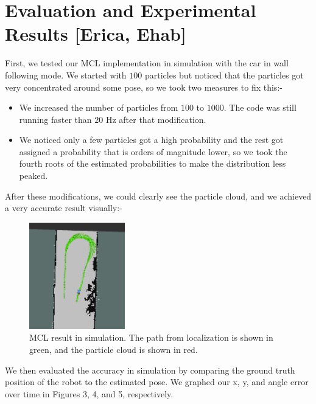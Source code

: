 \documentclass[11pt,twocolumn]{article}
\begin{document}
\section{Evaluation and Experimental Results [Erica, Ehab]}

First, we tested our MCL implementation in simulation with the car in wall following mode. We started with $100$ particles but noticed that the particles got very concentrated around some pose, so we took two measures to fix this:-

\begin{itemize}
    \item We increased the number of particles from $100$ to $1000$. The code was still running faster than $20$ Hz after that modification.
    \item We noticed only a few particles got a high probability and the rest got assigned a probability that is orders of magnitude lower, so we took the fourth roots of the estimated probabilities to make the distribution less peaked.
\end{itemize}

After these modifications, we could clearly see the particle cloud, and we achieved a very accurate result visually:-

\begin{figure}[H]
    \centering
    \includegraphics{RSS_localization.png}
    \caption{MCL result in simulation. The path from localization is shown in green, and the particle cloud is shown in red.}
    \label{fig:enter-label}
\end{figure}

We then evaluated the accuracy in simulation by comparing the ground truth position of the robot to the estimated pose. We graphed our x, y, and angle error over time in Figures 3, 4, and 5, respectively.
\end{document}
